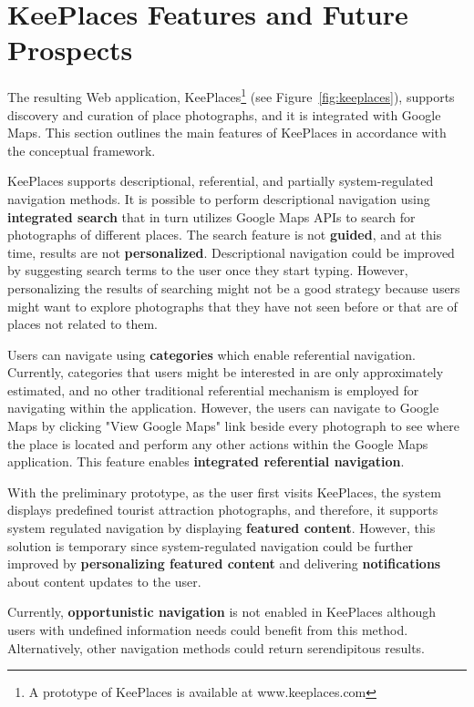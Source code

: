 {\section{KeePlaces Features and Future Prospects}
The resulting Web application, KeePlaces\footnote[1]{A prototype of KeePlaces is available at www.keeplaces.com} (see Figure~\ref{fig:keeplaces}), supports discovery and curation of place photographs, and it is integrated with Google Maps. This section outlines the main features of KeePlaces in accordance with the conceptual framework. 

KeePlaces supports descriptional, referential, and partially system-regulated navigation methods. It is possible to perform descriptional navigation using \textbf{integrated search} that in turn utilizes Google Maps APIs to search for photographs of different places. The search feature is not \textbf{guided}, and at this time, results are not \textbf{personalized}. Descriptional navigation could be improved by suggesting search terms to the user once they start typing. However, personalizing the results of searching might not be a good strategy because users might want to explore photographs that they have not seen before or that are of places not related to them. 

Users can navigate using \textbf{categories} which enable referential navigation. Currently, categories that users might be interested in are only approximately estimated, and no other traditional referential mechanism is employed for navigating within the application. However, the users can navigate to Google Maps by clicking "View Google Maps" link beside every photograph to see where the place is located and perform any other actions within the Google Maps application. This feature enables \textbf{integrated referential navigation}. 

With the preliminary prototype, as the user first visits KeePlaces, the system displays predefined tourist attraction photographs, and therefore, it supports system regulated navigation by displaying \textbf{featured content}. However, this solution is temporary since system-regulated navigation could be further improved by \textbf{personalizing featured content} and delivering \textbf{notifications} about content updates to the user. 

Currently, \textbf{opportunistic navigation} is not enabled in KeePlaces although users with undefined information needs could benefit from this method. Alternatively, other navigation methods could return serendipitous results.

}
